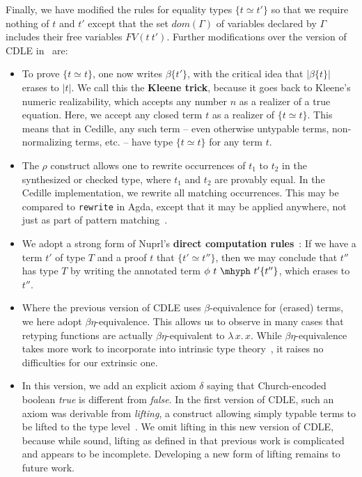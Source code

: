 \documentclass{article}
\newcommand{\absu}[3]{{#1}\, #2.\, #3}
\begin{document}
Finally, we have modified
the rules for equality types $\{ t \simeq t' \}$ so that we require
nothing of $t$ and $t'$ except that the set $\textit{dom}(\Gamma)$ of variables
declared by $\Gamma$ includes their free variables $\textit{FV}(t\ t')$.  Further modifications
over the version of CDLE in~\cite{stump18} are:
\begin{itemize}
\item To prove $\{ t \simeq t\}$, one now writes $\beta\{t'\}$,
  with the critical idea that $|\beta\{t\}|$ erases to $|t|$.  We call this the \textbf{Kleene trick},
  because it goes back to Kleene's numeric realizability, which accepts any number $n$ as a realizer
  of a true equation.  Here, we accept any closed term $t$ as a realizer
  of $\{ t \simeq t\}$.  This means that in Cedille, any such term -- even otherwise untypable
  terms, non-normalizing terms, etc. -- have type $\{ t \simeq t\}$ for any term $t$.
\item The $\rho$ construct allows one to rewrite occurrences of $t_1$ to $t_2$ in the synthesized or
  checked type, where $t_1$ and $t_2$ are provably equal.  In the Cedille implementation, we rewrite
  all matching occurrences.  This may be compared to \verb|rewrite| in Agda, except that it may be
  applied anywhere, not just as part of pattern matching~\cite{agda}.
\item We adopt a strong form of Nuprl's \textbf{direct computation rules}~\cite{constable+86}:
  If we have a term $t'$ of type $T$ and a proof $t$ that $\{ t' \simeq t''\}$, then we may conclude that
  $t''$ has type $T$ by writing the annotated term $\phi\ t\ \mhyph\ t'\{t''\}$, which
  erases to $t''$.
\item Where the previous version of CDLE uses $\beta$-equivalence for (erased) terms, we here adopt $\beta\eta$-equivalence.  This
  allows us to observe in many cases that retyping functions are actually $\beta\eta$-equivalent to $\absu{\lambda}{x}{x}$.
  While $\beta\eta$-equivalence takes more work to incorporate into intrinsic 
  type theory~\cite{geuvers92},
  it raises no difficulties for our extrinsic one.
\item In this version, we add an explicit axiom $\delta$ saying that Church-encoded boolean \emph{true} is different from
  \emph{false}.  In the first version of CDLE, such an axiom was derivable from \emph{lifting}, a construct allowing
  simply typable terms to be lifted to the type level~\cite{stump17}.  We omit lifting in this new version of CDLE, because while
  sound, lifting as defined in that previous work is complicated and appears to be incomplete.  Developing a new
  form of lifting remains to future work.
\end{itemize}
\end{document}
